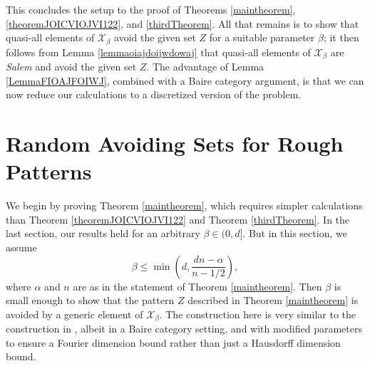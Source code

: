 \documentclass[dvipsnames,letterpaper,12pt]{article}
\numberwithin{equation}{section}
\numberwithin{theorem}{section}
\begin{document}
This concludes the setup to the proof of Theorems \ref{maintheorem}, \ref{theoremJOICVIOJVI122}, and \ref{thirdTheorem}. All that remains is to show that quasi-all elements of $\mathcal{X}_\beta$ avoid the given set $Z$ for a suitable parameter $\beta$; it then follows from Lemma \ref{lemmaoiajdoijwdowaj} that quasi-all elements of $\mathcal{X}_\beta$ are \emph{Salem} and avoid the given set $Z$. The advantage of Lemma \ref{LemmaFIOAJFOIWJ}, combined with a Baire category argument, is that we can now reduce our calculations to a discretized version of the problem.

\section{Random Avoiding Sets for Rough Patterns}

We begin by proving Theorem \ref{maintheorem}, which requires simpler calculations than Theorem \ref{theoremJOICVIOJVI122} and Theorem \ref{thirdTheorem}. In the last section, our results held for an arbitrary $\beta \in (0,d]$. But in this section, we assume
%
\[ \beta \leq \min \left( d, \frac{dn - \alpha}{n - 1/2} \right), \]
%
where $\alpha$ and $n$ are as in the statement of Theorem \ref{maintheorem}. Then $\beta$ is small enough to show that the pattern $Z$ described in Theorem \ref{maintheorem} is avoided by a generic element of $\mathcal{X}_\beta$. The construction here is very similar to the construction in \cite{OurPaper}, albeit in a Baire category setting, and with modified parameters to ensure a Fourier dimension bound rather than just a Hausdorff dimension bound.
\end{document}
